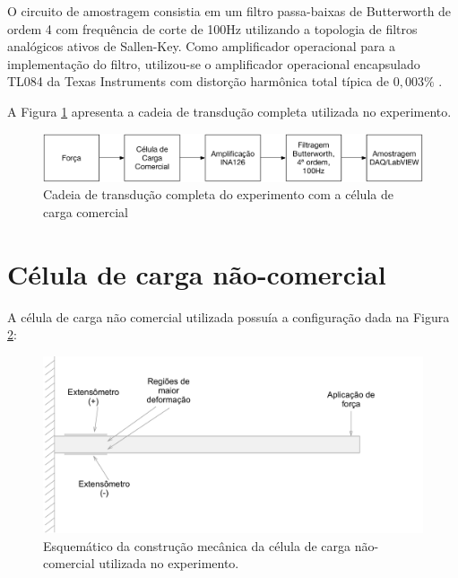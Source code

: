 \documentclass[a4paper]{instrumentacao}
\begin{document}
O circuito de amostragem consistia em um filtro passa-baixas de Butterworth de ordem 4 com frequência de corte de 100Hz utilizando a topologia de filtros analógicos ativos de Sallen-Key. Como amplificador operacional para a implementação do filtro, utilizou-se o amplificador operacional encapsulado TL084 da Texas Instruments com distorção harmônica total típica de $0,003\%$ \cite{datasheet-tl084}.

A Figura \ref{fig:celula-comercial-cadeia-transducao} apresenta a cadeia de transdução completa utilizada no experimento.

\begin{figure}[H]
\center
\includegraphics[width=\textwidth]{Comercial-Cadeia-Transducao.pdf}
\caption{Cadeia de transdução completa do experimento com a célula de carga comercial}
\label{fig:celula-comercial-cadeia-transducao}
\end{figure}


\section{Célula de carga não-comercial}

A célula de carga não comercial utilizada possuía a configuração dada na Figura \ref{fig:celula-nao-comercial-desenho}:

\begin{figure}[H]
\center
\includegraphics[width=\textwidth]{CelulaNaoComercial.pdf}
\caption{Esquemático da construção mecânica da célula de carga não-comercial utilizada no experimento.}
\label{fig:celula-nao-comercial-desenho}
\end{figure}
\end{document}
